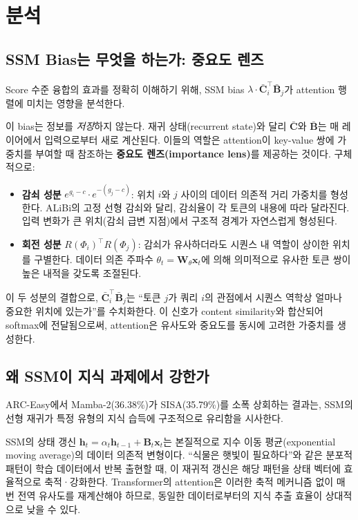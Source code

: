 \documentclass[11pt]{article}
\begin{document}
\section{분석}

\subsection{SSM Bias는 무엇을 하는가: 중요도 렌즈}

Score 수준 융합의 효과를 정확히 이해하기 위해, SSM bias $\lambda \cdot \bar{\mathbf{C}}_i^\top \bar{\mathbf{B}}_j$가 attention 행렬에 미치는 영향을 분석한다.

이 bias는 정보를 \emph{저장}하지 않는다. 재귀 상태(recurrent state)와 달리 $\bar{\mathbf{C}}$와 $\bar{\mathbf{B}}$는 매 레이어에서 입력으로부터 새로 계산된다. 이들의 역할은 attention이 key-value 쌍에 가중치를 부여할 때 참조하는 \textbf{중요도 렌즈(importance lens)}를 제공하는 것이다. 구체적으로:

\begin{itemize}[leftmargin=*]
\item \textbf{감쇠 성분} $e^{g_i - c} \cdot e^{-(g_j - c)}$: 위치 $i$와 $j$ 사이의 데이터 의존적 거리 가중치를 형성한다. ALiBi의 고정 선형 감쇠와 달리, 감쇠율이 각 토큰의 내용에 따라 달라진다. 입력 변화가 큰 위치(감쇠 급변 지점)에서 구조적 경계가 자연스럽게 형성된다.

\item \textbf{회전 성분} $R(\Phi_i)^\top R(\Phi_j)$: 감쇠가 유사하더라도 시퀀스 내 역할이 상이한 위치를 구별한다. 데이터 의존 주파수 $\theta_t = \mathbf{W}_\theta \mathbf{x}_t$에 의해 의미적으로 유사한 토큰 쌍이 높은 내적을 갖도록 조절된다.
\end{itemize}

이 두 성분의 결합으로, $\bar{\mathbf{C}}_i^\top \bar{\mathbf{B}}_j$는 ``토큰 $j$가 쿼리 $i$의 관점에서 시퀀스 역학상 얼마나 중요한 위치에 있는가''를 수치화한다. 이 신호가 content similarity와 합산되어 softmax에 전달됨으로써, attention은 유사도와 중요도를 동시에 고려한 가중치를 생성한다.

\subsection{왜 SSM이 지식 과제에서 강한가}

ARC-Easy에서 Mamba-2(36.38\%)가 SISA(35.79\%)를 소폭 상회하는 결과는, SSM의 선형 재귀가 특정 유형의 지식 습득에 구조적으로 유리함을 시사한다.

SSM의 상태 갱신 $\mathbf{h}_t = \alpha_t \mathbf{h}_{t-1} + \mathbf{B}_t \mathbf{x}_t$는 본질적으로 지수 이동 평균(exponential moving average)의 데이터 의존적 변형이다. ``식물은 햇빛이 필요하다''와 같은 분포적 패턴이 학습 데이터에서 반복 출현할 때, 이 재귀적 갱신은 해당 패턴을 상태 벡터에 효율적으로 축적·강화한다. Transformer의 attention은 이러한 축적 메커니즘 없이 매번 전역 유사도를 재계산해야 하므로, 동일한 데이터로부터의 지식 추출 효율이 상대적으로 낮을 수 있다.
\end{document}

